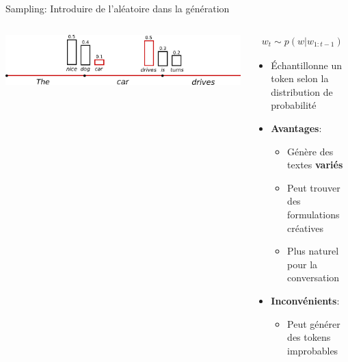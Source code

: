 \documentclass[aspectratio=169]{beamer}
\begin{document}
\begin{frame}{Sampling: Introduire de l'aléatoire dans la génération}
    \begin{columns}
        \begin{column}{0.5\textwidth}
            \begin{center}
                \includegraphics[width=\textwidth]{images/sampling.png}
            \end{center}
        \end{column}
        \begin{column}{0.5\textwidth}
            \begin{align*}
                w_t \sim p(w|w_{1:t-1})
            \end{align*}
            \begin{itemize}
                \item Échantillonne un token selon la distribution de probabilité
                \item \textbf{Avantages}:
                \begin{itemize}
                    \item Génère des textes \textbf{variés}
                    \item Peut trouver des formulations créatives
                    \item Plus naturel pour la conversation
                \end{itemize}
                \item \textbf{Inconvénients}:
                \begin{itemize}
                    \item Peut générer des tokens improbables
                \end{itemize}
            \end{itemize}
        \end{column}
    \end{columns}
\end{frame}
\end{document}
